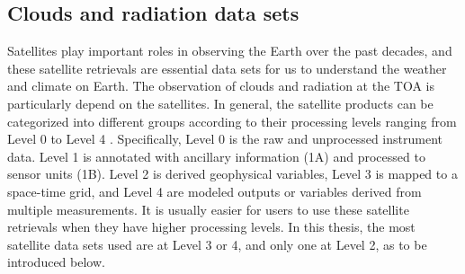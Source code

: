 \subsection{Clouds and radiation data sets}
Satellites play important roles in observing the Earth over the past decades, and these satellite retrievals are essential data sets for us to understand the weather and climate on Earth. The observation of clouds and radiation at the TOA is particularly depend on the satellites. In general, the satellite products can be categorized into different groups according to their processing levels ranging from Level 0 to Level 4 \citep{Parkinson2006earth}. Specifically, Level 0 is the raw and unprocessed instrument data. Level 1 is annotated with ancillary information (1A) and processed to sensor units (1B). Level 2 is derived geophysical variables, Level 3 is mapped to a space-time grid, and Level 4 are modeled outputs or variables derived from multiple measurements. It is usually easier for users to use these satellite retrievals when they have higher processing levels. In this thesis, the most satellite data sets used are at Level 3 or 4, and only one at Level 2, as to be introduced below.



